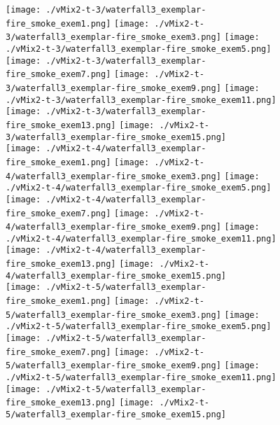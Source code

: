 \begin{figure}[ht!]
{\vspace{1mm}
    \texttt{[image: ./vMix2-t-3/waterfall3\_exemplar-fire\_smoke\_exem1.png]}
    \texttt{[image: ./vMix2-t-3/waterfall3\_exemplar-fire\_smoke\_exem3.png]}
    \texttt{[image: ./vMix2-t-3/waterfall3\_exemplar-fire\_smoke\_exem5.png]}
    \texttt{[image: ./vMix2-t-3/waterfall3\_exemplar-fire\_smoke\_exem7.png]}
    \texttt{[image: ./vMix2-t-3/waterfall3\_exemplar-fire\_smoke\_exem9.png]}
    \texttt{[image: ./vMix2-t-3/waterfall3\_exemplar-fire\_smoke\_exem11.png]}
    \texttt{[image: ./vMix2-t-3/waterfall3\_exemplar-fire\_smoke\_exem13.png]}
    \texttt{[image: ./vMix2-t-3/waterfall3\_exemplar-fire\_smoke\_exem15.png]} \\
\vspace{1mm}
    \texttt{[image: ./vMix2-t-4/waterfall3\_exemplar-fire\_smoke\_exem1.png]}
    \texttt{[image: ./vMix2-t-4/waterfall3\_exemplar-fire\_smoke\_exem3.png]}
    \texttt{[image: ./vMix2-t-4/waterfall3\_exemplar-fire\_smoke\_exem5.png]}
    \texttt{[image: ./vMix2-t-4/waterfall3\_exemplar-fire\_smoke\_exem7.png]}
    \texttt{[image: ./vMix2-t-4/waterfall3\_exemplar-fire\_smoke\_exem9.png]}
    \texttt{[image: ./vMix2-t-4/waterfall3\_exemplar-fire\_smoke\_exem11.png]}
    \texttt{[image: ./vMix2-t-4/waterfall3\_exemplar-fire\_smoke\_exem13.png]}
    \texttt{[image: ./vMix2-t-4/waterfall3\_exemplar-fire\_smoke\_exem15.png]} \\
\vspace{1mm}
    \texttt{[image: ./vMix2-t-5/waterfall3\_exemplar-fire\_smoke\_exem1.png]}
    \texttt{[image: ./vMix2-t-5/waterfall3\_exemplar-fire\_smoke\_exem3.png]}
    \texttt{[image: ./vMix2-t-5/waterfall3\_exemplar-fire\_smoke\_exem5.png]}
    \texttt{[image: ./vMix2-t-5/waterfall3\_exemplar-fire\_smoke\_exem7.png]}
    \texttt{[image: ./vMix2-t-5/waterfall3\_exemplar-fire\_smoke\_exem9.png]}
    \texttt{[image: ./vMix2-t-5/waterfall3\_exemplar-fire\_smoke\_exem11.png]}
    \texttt{[image: ./vMix2-t-5/waterfall3\_exemplar-fire\_smoke\_exem13.png]}
    \texttt{[image: ./vMix2-t-5/waterfall3\_exemplar-fire\_smoke\_exem15.png]} \\
}
\end{figure}
